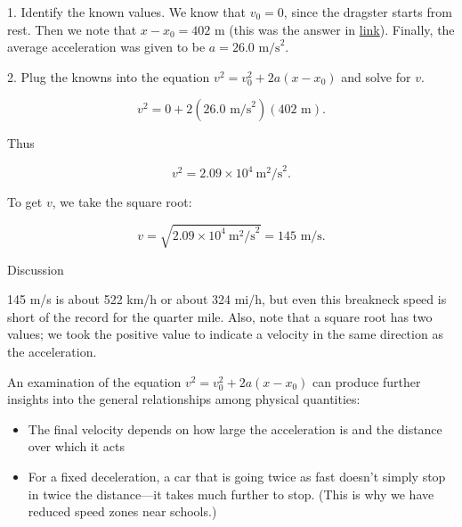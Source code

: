 \documentclass[
]{book}
\providecommand{\tightlist}{%
  \setlength{\itemsep}{0pt}\setlength{\parskip}{0pt}}
\newenvironment{tinysection}{}{}
\begin{document}
1. Identify the known values. We know that \({v_{0} = 0}{}\), since the
dragster starts from rest. Then we note that
\({{x - x_{0}} = \text{402\ m}}{}\) (this was the answer in
\protect\hyperlink{fs-id1164906457202}{link}). Finally, the
average acceleration was given to be
\({{a = \text{26}}\text{.}\text{0\ m/s}^{2}}{}\).

2. Plug the knowns into the equation
\({v^{2} = {v_{0}^{2} + 2a}}({x - x_{0}})\) and solve for \(v.\)

\leavevmode\hypertarget{import-auto-id1680164}{}%
\[{{{v^{2} = {0 + 2}}\left( {\text{26}\text{.}\text{0\ m/s}^{2}} \right)\left( \text{402\ m} \right)}.}{}\]

Thus

\leavevmode\hypertarget{import-auto-id2177794}{}%
\[{{{v^{2} = 2}\text{.}{\text{09} \times \text{10}^{4}}\ \text{m}^{2}\text{/s}^{2}}.}{}\]

To get \(v{}\), we take the square root:

\leavevmode\hypertarget{import-auto-id2177812}{}%
\[{{v = \sqrt{2\text{.}{\text{09} \times \text{10}^{4}}\ \text{m}^{2}\text{/s}^{2}}} = \text{145\ m/s}}.\]

\begin{tinysection}

{Discussion}

\end{tinysection}

145 m/s is about 522 km/h or about 324 mi/h, but even this breakneck
speed is short of the record for the quarter mile. Also, note that a
square root has two values; we took the positive value to indicate a
velocity in the same direction as the acceleration.

An examination of the equation
\({{v^{2} = {v_{0}^{2} + 2a}}({x - x_{0}})}{}\) can produce further
insights into the general relationships among physical quantities:

\begin{itemize}
\tightlist
\item
  \protect\hypertarget{import-auto-id1680053}{}{The final velocity depends on how large the acceleration is and the
  distance over which it acts}
\item
  \protect\hypertarget{import-auto-id1680020}{}{For a fixed deceleration, a car that is going twice as fast
  doesn't simply stop in twice the distance---it takes much further
  to stop. (This is why we have reduced speed zones near
  schools.)}
\end{itemize}
\end{document}
